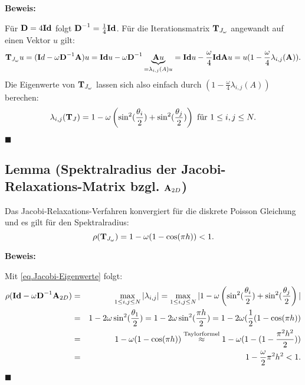 \textbf{Beweis:}\label{sss.EW JacobiRelax}

Für ${\textbf{D}} = 4 {\textbf{Id}}$ folgt ${\textbf{D}}^{-1} = \frac {1} {4} {\textbf{Id}}$. Für die Iterationsmatrix ${\textbf{T}}_{J_{\omega}}$ angewandt auf einen Vektor $u$ gilt:
\begin{eqnarray}
{\textbf{T}}_{J_{\omega}}u = ({\textbf{I}}d - \omega {\textbf{D}}^{-1}{\textbf{A}})u = {\textbf{Id}} u - \omega {\textbf{D}}^{-1} \underbrace{{\textbf{A}}u}_{=\lambda_{i,j}(A) u} = {\textbf{Id}} u - \frac {\omega} {4} {\textbf{Id}} {\textbf{A}} u = u (1 - \frac {\omega} {4} \lambda_{i,j}({\textbf{A}})). \notag
\end{eqnarray}
Die Eigenwerte von ${\textbf{T}}_{J_{\omega}}$ lassen sich also einfach durch $(1 - \frac {\omega} {4} \lambda_{i,j}(A))$ berechen:
\begin{equation}
\lambda_{i,j}({\textbf{T}}_{J}) = 1 - \omega \left(\sin^{2}(\frac {\theta_{i}} {2}) + \sin^{2}(\frac {\theta_{j}} {2}) \right) \textnormal{ für } 1 \le i,j \le N. \notag
\end{equation}
\begin{flushright}
$\blacksquare$
\end{flushright}

\subsection{Lemma (Spektralradius der Jacobi-Relaxations-Matrix bzgl. ${\textbf{A}}_{2D}$)}\label{ss.Spektralradius Jacobi Relax}

Das Jacobi-Relaxations-Verfahren konvergiert für die diskrete Poisson Gleichung und es gilt für den Spektralradius:
\begin{equation}
\rho({\textbf{T}}_{J_{\omega}}) = 1 - \omega(1 - \cos (\pi h)) < 1.
\end{equation}

\textbf{Beweis:}\label{b.Spektral JacobiRelax}

Mit \autoref{eq.Jacobi-Eigenwerte} folgt:
\begin{eqnarray}
\rho({\textbf{Id}}-\omega{\textbf{D}}^{-1}{\textbf{A}}_{2D}) &=& \max_{1 \le i,j \le N} | \lambda_{i,j} | = \max_{1 \le i,j \le N} | 1 - \omega \left(\sin^{2}(\frac {\theta_{i}} {2}) + \sin^{2}(\frac {\theta_{j}} {2} \right) | \notag \\
&=& 1 - 2 \omega \sin^{2} (\frac {\theta_{1}} {2}) = 1 - 2 \omega \sin^{2} (\frac {\pi h} {2}) = 1 - 2 \omega (\frac{1} {2} (1 - \cos (\pi h)) \notag \\
&=& 1 - \omega(1 - \cos (\pi h)) \overset{\textnormal{Taylorformel}}{\approx} 1 - \omega(1-(1-\frac{\pi^{2} h^{2}}{2})) \notag \\
&=& 1 - \frac {\omega} {2} \pi^{2} h^{2} < 1. \notag
\end{eqnarray}
\begin{flushright}
$\blacksquare$
\end{flushright}

